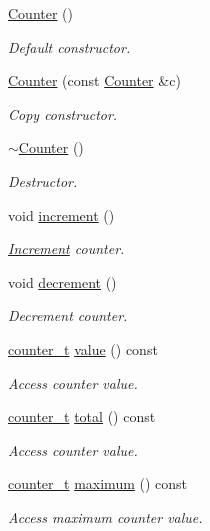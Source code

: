 \begin{DoxyCompactItemize}
\item 
\hyperlink{class_d_d4hep_1_1_instance_count_1_1_counter_a80741252e730cdf0cb149b77578168a0}{Counter} ()
\begin{DoxyCompactList}\small\item\em Default constructor. \end{DoxyCompactList}\item 
\hyperlink{class_d_d4hep_1_1_instance_count_1_1_counter_aa8a1753db486e2ebee02236dee29ec66}{Counter} (const \hyperlink{class_d_d4hep_1_1_instance_count_1_1_counter}{Counter} \&c)
\begin{DoxyCompactList}\small\item\em Copy constructor. \end{DoxyCompactList}\item 
\hyperlink{class_d_d4hep_1_1_instance_count_1_1_counter_a6bd715538db93a8e4b4f9a27c4b0c793}{$\sim$\+Counter} ()
\begin{DoxyCompactList}\small\item\em Destructor. \end{DoxyCompactList}\item 
void \hyperlink{class_d_d4hep_1_1_instance_count_1_1_counter_aa127bfbbe011428fcbbeeaa7dfd25e1e}{increment} ()
\begin{DoxyCompactList}\small\item\em \hyperlink{struct_d_d4hep_1_1_increment}{Increment} counter. \end{DoxyCompactList}\item 
void \hyperlink{class_d_d4hep_1_1_instance_count_1_1_counter_abe6d3ce948fd3c9a990054bf44737054}{decrement} ()
\begin{DoxyCompactList}\small\item\em Decrement counter. \end{DoxyCompactList}\item 
\hyperlink{struct_d_d4hep_1_1_instance_count_ae81dc0c76b135425e14b6dc38262a727}{counter\+\_\+t} \hyperlink{class_d_d4hep_1_1_instance_count_1_1_counter_a3ed75b4aa541d4467fc9ae5109d67476}{value} () const
\begin{DoxyCompactList}\small\item\em Access counter value. \end{DoxyCompactList}\item 
\hyperlink{struct_d_d4hep_1_1_instance_count_ae81dc0c76b135425e14b6dc38262a727}{counter\+\_\+t} \hyperlink{class_d_d4hep_1_1_instance_count_1_1_counter_a147f1ee4ebf0b23bf603367032f662c7}{total} () const
\begin{DoxyCompactList}\small\item\em Access counter value. \end{DoxyCompactList}\item 
\hyperlink{struct_d_d4hep_1_1_instance_count_ae81dc0c76b135425e14b6dc38262a727}{counter\+\_\+t} \hyperlink{class_d_d4hep_1_1_instance_count_1_1_counter_a17fd35e34e2dd9bd76d6a4449b04630d}{maximum} () const
\begin{DoxyCompactList}\small\item\em Access maximum counter value. \end{DoxyCompactList}\end{DoxyCompactItemize}
